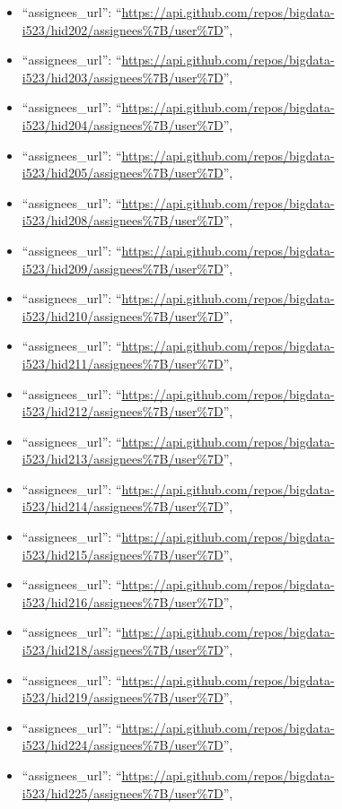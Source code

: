 \begin{itemize}
\item
  ``assignees\_url'':
  ``\url{https://api.github.com/repos/bigdata-i523/hid202/assignees\%7B/user\%7D}'',
\item
  ``assignees\_url'':
  ``\url{https://api.github.com/repos/bigdata-i523/hid203/assignees\%7B/user\%7D}'',
\item
  ``assignees\_url'':
  ``\url{https://api.github.com/repos/bigdata-i523/hid204/assignees\%7B/user\%7D}'',
\item
  ``assignees\_url'':
  ``\url{https://api.github.com/repos/bigdata-i523/hid205/assignees\%7B/user\%7D}'',
\item
  ``assignees\_url'':
  ``\url{https://api.github.com/repos/bigdata-i523/hid208/assignees\%7B/user\%7D}'',
\item
  ``assignees\_url'':
  ``\url{https://api.github.com/repos/bigdata-i523/hid209/assignees\%7B/user\%7D}'',
\item
  ``assignees\_url'':
  ``\url{https://api.github.com/repos/bigdata-i523/hid210/assignees\%7B/user\%7D}'',
\item
  ``assignees\_url'':
  ``\url{https://api.github.com/repos/bigdata-i523/hid211/assignees\%7B/user\%7D}'',
\item
  ``assignees\_url'':
  ``\url{https://api.github.com/repos/bigdata-i523/hid212/assignees\%7B/user\%7D}'',
\item
  ``assignees\_url'':
  ``\url{https://api.github.com/repos/bigdata-i523/hid213/assignees\%7B/user\%7D}'',
\item
  ``assignees\_url'':
  ``\url{https://api.github.com/repos/bigdata-i523/hid214/assignees\%7B/user\%7D}'',
\item
  ``assignees\_url'':
  ``\url{https://api.github.com/repos/bigdata-i523/hid215/assignees\%7B/user\%7D}'',
\item
  ``assignees\_url'':
  ``\url{https://api.github.com/repos/bigdata-i523/hid216/assignees\%7B/user\%7D}'',
\item
  ``assignees\_url'':
  ``\url{https://api.github.com/repos/bigdata-i523/hid218/assignees\%7B/user\%7D}'',
\item
  ``assignees\_url'':
  ``\url{https://api.github.com/repos/bigdata-i523/hid219/assignees\%7B/user\%7D}'',
\item
  ``assignees\_url'':
  ``\url{https://api.github.com/repos/bigdata-i523/hid224/assignees\%7B/user\%7D}'',
\item
  ``assignees\_url'':
  ``\url{https://api.github.com/repos/bigdata-i523/hid225/assignees\%7B/user\%7D}'',

\end{itemize}

